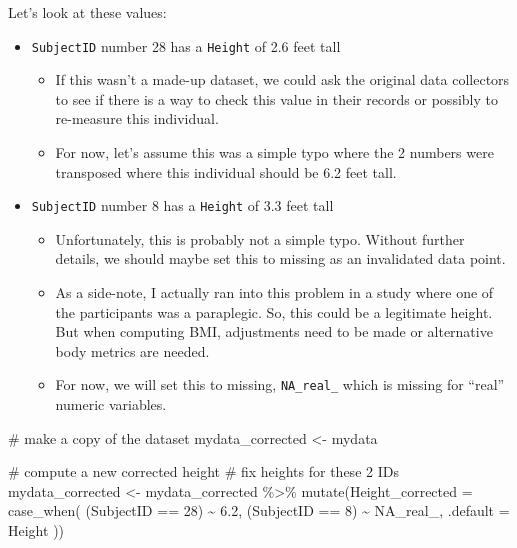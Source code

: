\documentclass[
  letterpaper,
  DIV=11,
  numbers=noendperiod]{scrartcl}
\newenvironment{Shaded}{\begin{snugshade}}{\end{snugshade}}
\newcommand{\AttributeTok}[1]{\textcolor[rgb]{0.40,0.45,0.13}{#1}}
\newcommand{\CommentTok}[1]{\textcolor[rgb]{0.37,0.37,0.37}{#1}}
\newcommand{\ConstantTok}[1]{\textcolor[rgb]{0.56,0.35,0.01}{#1}}
\newcommand{\DecValTok}[1]{\textcolor[rgb]{0.68,0.00,0.00}{#1}}
\newcommand{\FloatTok}[1]{\textcolor[rgb]{0.68,0.00,0.00}{#1}}
\newcommand{\FunctionTok}[1]{\textcolor[rgb]{0.28,0.35,0.67}{#1}}
\newcommand{\NormalTok}[1]{\textcolor[rgb]{0.00,0.23,0.31}{#1}}
\newcommand{\OtherTok}[1]{\textcolor[rgb]{0.00,0.23,0.31}{#1}}
\newcommand{\SpecialCharTok}[1]{\textcolor[rgb]{0.37,0.37,0.37}{#1}}
\providecommand{\tightlist}{%
  \setlength{\itemsep}{0pt}\setlength{\parskip}{0pt}}\usepackage{longtable,booktabs,array}
\begin{document}
Let's look at these values:

\begin{itemize}
\tightlist
\item
  \texttt{SubjectID} number 28 has a \texttt{Height} of 2.6 feet tall

  \begin{itemize}
  \tightlist
  \item
    If this wasn't a made-up dataset, we could ask the original data
    collectors to see if there is a way to check this value in their
    records or possibly to re-measure this individual.
  \item
    For now, let's assume this was a simple typo where the 2 numbers
    were transposed where this individual should be 6.2 feet tall.
  \end{itemize}
\item
  \texttt{SubjectID} number 8 has a \texttt{Height} of 3.3 feet tall

  \begin{itemize}
  \tightlist
  \item
    Unfortunately, this is probably not a simple typo. Without further
    details, we should maybe set this to missing as an invalidated data
    point.
  \item
    As a side-note, I actually ran into this problem in a study where
    one of the participants was a paraplegic. So, this could be a
    legitimate height. But when computing BMI, adjustments need to be
    made or alternative body metrics are needed.
  \item
    For now, we will set this to missing, \texttt{NA\_real\_} which is
    missing for ``real'' numeric variables.
  \end{itemize}
\end{itemize}

\begin{Shaded}
\begin{Highlighting}[]
\CommentTok{\# make a copy of the dataset}
\NormalTok{mydata\_corrected }\OtherTok{\textless{}{-}}\NormalTok{ mydata}

\CommentTok{\# compute a new corrected height}
\CommentTok{\# fix heights for these 2 IDs}
\NormalTok{mydata\_corrected }\OtherTok{\textless{}{-}} 
\NormalTok{  mydata\_corrected }\SpecialCharTok{\%\textgreater{}\%}
  \FunctionTok{mutate}\NormalTok{(}\AttributeTok{Height\_corrected =} \FunctionTok{case\_when}\NormalTok{(}
\NormalTok{    (SubjectID }\SpecialCharTok{==} \DecValTok{28}\NormalTok{) }\SpecialCharTok{\textasciitilde{}} \FloatTok{6.2}\NormalTok{,}
\NormalTok{    (SubjectID }\SpecialCharTok{==} \DecValTok{8}\NormalTok{) }\SpecialCharTok{\textasciitilde{}} \ConstantTok{NA\_real\_}\NormalTok{,}
    \AttributeTok{.default =}\NormalTok{ Height}
\NormalTok{  ))}
\end{Highlighting}
\end{Shaded}
\end{document}
